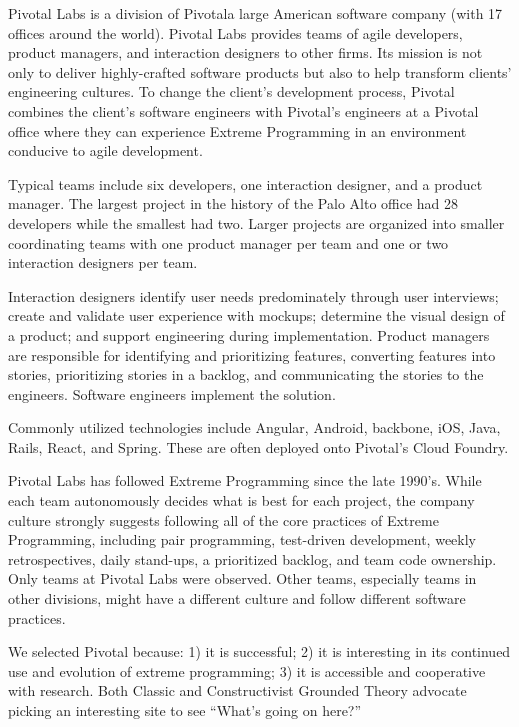Pivotal Labs is a division of Pivotal\textemdash a large American software company (with 17 offices around the world). Pivotal Labs provides teams of agile developers, product managers, and interaction designers to other firms. Its mission is not only to deliver highly-crafted software products but also to help transform clients' engineering cultures. To change the client's development process, Pivotal combines the client's software engineers with Pivotal's engineers at a Pivotal office where they can experience Extreme Programming \cite{BeckExtremeProgramming2004} in an environment conducive to agile development. 

Typical teams include six developers, one interaction designer, and a product manager. The largest project in the history of the Palo Alto office had 28 developers while the smallest had two. Larger projects are organized into smaller coordinating teams with one product manager per team and one or two interaction designers per team.

Interaction designers identify user needs predominately through user interviews; create and validate user experience with mockups; determine the visual design of a product; and support engineering during implementation. Product managers are responsible for identifying and prioritizing features, converting features into stories, prioritizing stories in a backlog, and communicating the stories to the engineers. Software engineers implement the solution. 

Commonly utilized technologies include Angular, Android, backbone, iOS, Java, Rails, React, and Spring. These are often deployed onto Pivotal's Cloud Foundry. 

Pivotal Labs has followed Extreme Programming \cite{BeckExtremeProgramming2004} since the late 1990's. While each team autonomously decides what is best for each project, the company culture strongly suggests following all of the core practices of Extreme Programming, including pair programming, test-driven development, weekly retrospectives, daily stand-ups, a prioritized backlog, and team code ownership. Only  teams at Pivotal Labs were observed. Other teams, especially teams in other divisions, might have a different culture and follow different software practices.

We selected Pivotal because: 1) it is successful; 2) it is interesting in its continued use and evolution of extreme programming; 3) it is accessible and cooperative with research. Both Classic and Constructivist Grounded Theory advocate picking an interesting site to see “What's going on here?” 

